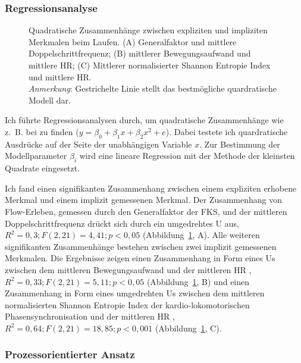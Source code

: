 \subsubsection{Regressionsanalyse} 

\label{ssub:regressionsanalyse} 
\begin{figure}
	[!htb]  \caption[Quadratische Zusammenhänge zwischen expliziten und impliziten Merkmalen (Erste Studie: Laufen)]{Quadratische Zusammenhänge zwischen expliziten und impliziten Merkmalen beim Laufen. (A) Generalfaktor und mittlere Doppelschrittfrequenz; (B) mittlerer Bewegungsaufwand und mittlere \ac{HR}; (C) Mittlerer normalisierter Shannon Entropie Index und mittlere \ac{HR}.\\
	\hspace{ 
	\textwidth}\emph{Anmerkung}: Gestrichelte Linie stellt das bestmögliche quardratische Modell dar.} \label{fig:regressionsanalyse_1} 
\end{figure}

Ich führte Regressionsanalysen durch, um quadratische Zusammenhänge wie z.~B. bei \citet{Peifer2014} zu finden ($y=\beta_{0}+\beta_{1}x+\beta_{2}x^{2}+e$). Dabei testete ich quardratische Ausdrücke auf der Seite der unabhängigen Variable $x$. Zur Bestimmung der Modellparameter $\beta_i$ wird eine lineare Regression mit der Methode der kleinsten Quadrate eingesetzt. 

Ich fand einen signifikanten Zusammenhang zwischen einem expliziten erhobene Merkmal und einem implizit gemessenen Merkmal. Der Zusammenhang von Flow-Erleben, gemessen durch den Generalfaktor der \ac{FKS}, und der mittleren Doppelschrittfrequenz drückt sich durch ein umgedrehtes U aus, $R^2 = 0{,}3; F(2, 21) = 4{,}41; p < 0{,}05$ (Abbildung~\ref{fig:regressionsanalyse_1}, A). Alle weiteren signifikanten Zusammenhänge bestehen zwischen zwei implizit gemessenen Merkmalen. Die Ergebnisse zeigen einen Zusammenhang in Form eines Us zwischen dem mittleren Bewegungsaufwand und der mittleren \ac{HR} , $R^2 = 0{,}33; F(2, 21) = 5{,}11; p < 0{,}05$ (Abbildung~\ref{fig:regressionsanalyse_1}, B) und einen Zusammenhang in Form eines umgedrehten Us zwischen dem mittleren normalisierten Shannon Entropie Index der kardio-lokomotorischen Phasensynchronisation und der mittleren \ac{HR} , $R^2 = 0{,}64; F(2, 21) = 18{,}85; p < 0{,}001$ (Abbildung~\ref{fig:regressionsanalyse_1}, C).

\subsubsection{Prozessorientierter Ansatz} 

